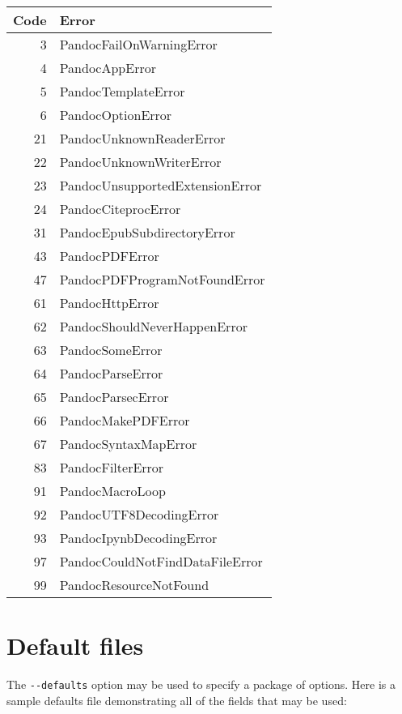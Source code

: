 \documentclass[]{article}
\begin{document}
\begin{longtable}[]{@{}rl@{}}
\toprule
Code & Error\tabularnewline
\midrule
\endhead
3 & PandocFailOnWarningError\tabularnewline
4 & PandocAppError\tabularnewline
5 & PandocTemplateError\tabularnewline
6 & PandocOptionError\tabularnewline
21 & PandocUnknownReaderError\tabularnewline
22 & PandocUnknownWriterError\tabularnewline
23 & PandocUnsupportedExtensionError\tabularnewline
24 & PandocCiteprocError\tabularnewline
31 & PandocEpubSubdirectoryError\tabularnewline
43 & PandocPDFError\tabularnewline
47 & PandocPDFProgramNotFoundError\tabularnewline
61 & PandocHttpError\tabularnewline
62 & PandocShouldNeverHappenError\tabularnewline
63 & PandocSomeError\tabularnewline
64 & PandocParseError\tabularnewline
65 & PandocParsecError\tabularnewline
66 & PandocMakePDFError\tabularnewline
67 & PandocSyntaxMapError\tabularnewline
83 & PandocFilterError\tabularnewline
91 & PandocMacroLoop\tabularnewline
92 & PandocUTF8DecodingError\tabularnewline
93 & PandocIpynbDecodingError\tabularnewline
97 & PandocCouldNotFindDataFileError\tabularnewline
99 & PandocResourceNotFound\tabularnewline
\bottomrule
\end{longtable}

\hypertarget{default-files}{%
\section{Default files}\label{default-files}}

The \texttt{-\/-defaults} option may be used to specify a package of
options. Here is a sample defaults file demonstrating all of the fields
that may be used:
\end{document}
